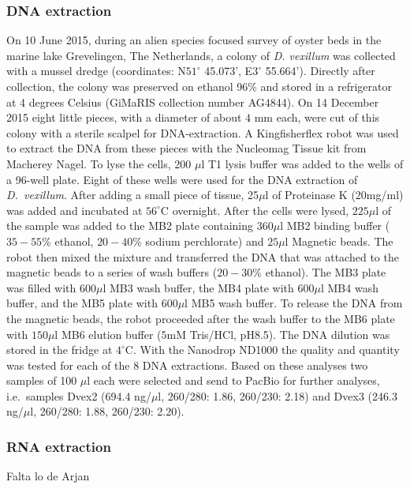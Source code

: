 \documentclass[11pt]{article}
\newcommand{\TODO}[1]{\begingroup\color{red}#1\endgroup}
\begin{document}
\subsubsection*{DNA extraction}
On 10 June 2015, during an alien species focused survey of oyster beds in the
marine lake Grevelingen, The Netherlands, a colony of \textit{D. vexillum} was
collected with a mussel dredge (coordinates: N$51^\circ$ 45.073’, E$3^\circ$
55.664’). Directly after collection, the colony was preserved on ethanol 96\%
and stored in a refrigerator at 4 degrees Celsius (GiMaRIS collection number
AG4844). On 14 December 2015 eight little pieces, with a diameter of about $4$ mm
each, were cut of this colony with a sterile scalpel for DNA-extraction. A
Kingfisherflex robot was used to extract the DNA from these pieces with the
Nucleomag Tissue kit from Macherey Nagel. To lyse the cells, 200 $\mu$l T1 lysis
buffer was added to the wells of a 96-well plate. Eight of these wells were used
for the DNA extraction of \textit{D.\ vexillum}. After adding a small piece of
tissue, 25$\mu$l of Proteinase K (20mg/ml) was added and incubated at $56^\circ$C
overnight. After the cells were lysed, $225\mu$l of the sample was added to the
MB2 plate containing $360 \mu$l MB2 binding buffer ($35-55$\% ethanol, $20-40$\%
sodium perchlorate) and $25 \mu$l Magnetic beads. The robot then mixed the
mixture and transferred the DNA that was attached to the magnetic beads to a
series of wash buffers ($20-30$\% ethanol). The MB3 plate was filled with
$600\mu$l MB3 wash buffer, the MB4 plate with $600\mu$l MB4 wash buffer, and the
MB5 plate with $600 \mu$l MB5 wash buffer. To release the DNA from the magnetic
beads, the robot proceeded after the wash buffer to the MB6 plate with $150
\mu$l MB6 elution buffer ($5$mM Tris/HCl, pH8.5). The DNA dilution was stored in
the fridge at $4^\circ$C. With the Nanodrop ND1000 the quality and quantity was
tested for each of the 8 DNA extractions. Based on these analyses two samples of
100 $\mu$l each were selected and send to PacBio for further analyses, i.e.\
samples Dvex2 (694.4 ng/$\mu$l, 260/280: 1.86, 260/230: 2.18) and Dvex3 (246.3
ng/$\mu$l, 260/280: 1.88, 260/230: 2.20).


\subsubsection*{RNA extraction}
\TODO{Falta lo de Arjan}
\end{document}
